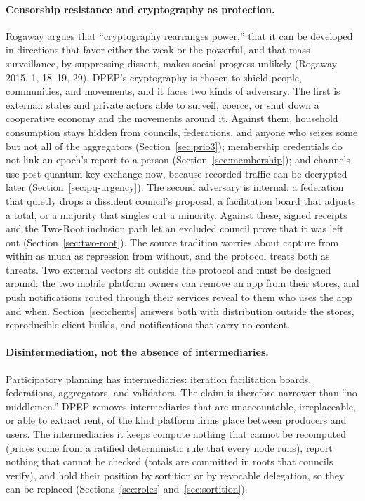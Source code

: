 \documentclass[10pt,twoside,openany]{book}
\theoremstyle{dpepstyle}
\begin{document}
\paragraph{Censorship resistance and cryptography as protection.} Rogaway argues that ``cryptography rearranges power,'' that it can be developed in directions that favor either the weak or the powerful, and that mass surveillance, by suppressing dissent, makes social progress unlikely (Rogaway 2015, 1, 18--19, 29). DPEP's cryptography is chosen to shield people, communities, and movements, and it faces two kinds of adversary. The first is external: states and private actors able to surveil, coerce, or shut down a cooperative economy and the movements around it. Against them, household consumption stays hidden from councils, federations, and anyone who seizes some but not all of the aggregators (Section~\ref{sec:prio3}); membership credentials do not link an epoch's report to a person (Section~\ref{sec:membership}); and channels use post-quantum key exchange now, because recorded traffic can be decrypted later (Section~\ref{sec:pq-urgency}). The second adversary is internal: a federation that quietly drops a dissident council's proposal, a facilitation board that adjusts a total, or a majority that singles out a minority. Against these, signed receipts and the Two-Root inclusion path let an excluded council prove that it was left out (Section~\ref{sec:two-root}). The source tradition worries about capture from within as much as repression from without, and the protocol treats both as threats. Two external vectors sit outside the protocol and must be designed around: the two mobile platform owners can remove an app from their stores, and push notifications routed through their services reveal to them who uses the app and when. Section~\ref{sec:clients} answers both with distribution outside the stores, reproducible client builds, and notifications that carry no content.

\paragraph{Disintermediation, not the absence of intermediaries.} Participatory planning has intermediaries: iteration facilitation boards, federations, aggregators, and validators. The claim is therefore narrower than ``no middlemen.'' DPEP removes intermediaries that are unaccountable, irreplaceable, or able to extract rent, of the kind platform firms place between producers and users. The intermediaries it keeps compute nothing that cannot be recomputed (prices come from a ratified deterministic rule that every node runs), report nothing that cannot be checked (totals are committed in roots that councils verify), and hold their position by sortition or by revocable delegation, so they can be replaced (Sections~\ref{sec:roles} and~\ref{sec:sortition}).
\end{document}
